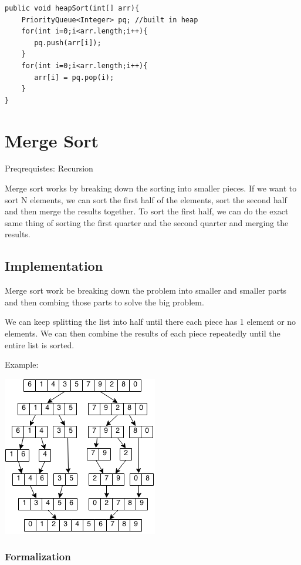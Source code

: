 \documentclass[11pt,oneside]{book}
\makeatletter
\def\maxwidth#1{\ifdim\Gin@nat@width>#1 #1\else\Gin@nat@width\fi}
\makeatother
\begin{document}
\begin{lstlisting}
public void heapSort(int[] arr){
    PriorityQueue<Integer> pq; //built in heap
    for(int i=0;i<arr.length;i++){
       pq.push(arr[i]);
    }
    for(int i=0;i<arr.length;i++){
       arr[i] = pq.pop(i);
    }
}
\end{lstlisting}
\section{Merge Sort}

Preqrequistes: Recursion

Merge sort works by breaking down the sorting into smaller pieces. If we want to sort N elements, we can sort the first half of the elements, sort the second half and then merge the results together. To sort the first half, we can do the exact same thing of sorting the first quarter and the second quarter and merging the results.

\subsection{Implementation}

Merge sort work be breaking down the problem into smaller and smaller parts and then combing those parts to solve the big problem.

We can keep splitting the list into half until there each piece has 1 element or no elements. We can then combine the results of each piece repeatedly until the entire list is sorted.

Example:

\includegraphics[width=\maxwidth{\textwidth}]{mergesort.png}

\subsubsection{Formalization}
\end{document}
